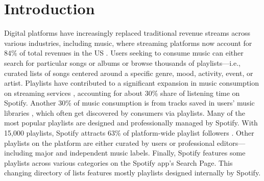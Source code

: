 \section{Introduction}
\label{sec:introduction}

Digital platforms have increasingly replaced traditional revenue streams across various industries, including music, where streaming platforms now account for $84\%$ of total revenues in the US \citep{riaa}. Users seeking to consume music can either search for particular songs or albums or browse thousands of playlists---i.e., curated lists of songs centered around a specific genre, mood, activity, event, or artist. Playlists have contributed to a significant expansion in music consumption on streaming services \citep{Datta_etal_MktScie}, accounting for about $30$\% share of listening time on Spotify. Another $30$\% of music consumption is from tracks saved in users' music libraries \citep[][]{spotifyf1filing}, which often get discovered by consumers via playlists. %
Many of the most popular playlists are designed and professionally managed by Spotify. %
With 15,000 playlists, Spotify attracts $63$\% of platform-wide playlist followers \citep[e.g.,][]{Aguiar_Waldfogel_power}.   %
%
%
%
Other playlists on the platform are either curated by users or professional editors---including major and independent music labels. %
Finally, Spotify features some playlists across various categories on the Spotify app’s Search Page. This changing directory of lists features mostly playlists designed internally by Spotify. 

